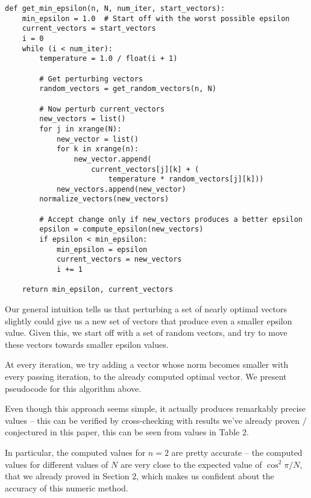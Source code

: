 \documentclass[11pt,letterpaper,twoside,english]{article}
\theoremstyle{theorem}
\theoremstyle{remark}
\begin{document}
\begin{lstlisting}
def get_min_epsilon(n, N, num_iter, start_vectors):
    min_epsilon = 1.0  # Start off with the worst possible epsilon
    current_vectors = start_vectors
    i = 0
    while (i < num_iter):
        temperature = 1.0 / float(i + 1)

        # Get perturbing vectors
        random_vectors = get_random_vectors(n, N)

        # Now perturb current_vectors
        new_vectors = list()
        for j in xrange(N):
            new_vector = list()
            for k in xrange(n):
                new_vector.append(
                    current_vectors[j][k] + (
                    	temperature * random_vectors[j][k]))
            new_vectors.append(new_vector)
        normalize_vectors(new_vectors)
        
        # Accept change only if new_vectors produces a better epsilon
        epsilon = compute_epsilon(new_vectors)
        if epsilon < min_epsilon:
            min_epsilon = epsilon
            current_vectors = new_vectors
            i += 1

    return min_epsilon, current_vectors
\end{lstlisting}

Our general intuition tells us that perturbing a set of nearly optimal vectors slightly could give us a new set of vectors that produce even a smaller epsilon value. Given this, we start off with a set of random vectors, and try to move these vectors towards smaller epsilon values.

At every iteration, we try adding a vector whose norm becomes smaller with every passing iteration, to the already computed optimal vector. We present pseudocode for this algorithm above.

Even though this approach seems simple, it actually produces remarkably precise values -- this can be verified by cross-checking with results we've already proven / conjectured in this paper, this can be seen from values in Table $2$.

In particular, the computed values for $n=2$ are pretty accurate -- the computed values for different values of $N$ are very close to the expected value of $\cos^2 \pi/N$, that we already proved in Section $2$, which makes us confident about the accuracy of this numeric method.
\end{document}
